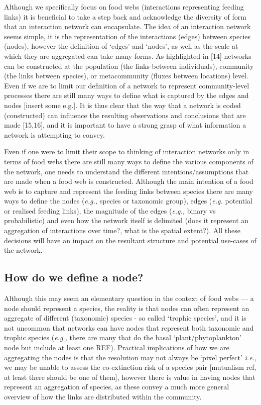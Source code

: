 \documentclass[
]{article}
\begin{document}
Although we specifically focus on food webs (interactions representing
feeding links) it is beneficial to take a step back and acknowledge the
diversity of form that an interaction network can encapsulate. The idea
of an interaction network seems simple, it is the representation of the
interactions (edges) between species (nodes), however the definition of
`edges' and `nodes', as well as the scale at which they are aggregated
can take many forms. As highlighted in {[}14{]} networks can be
constructed at the population (the links between individuals), community
(the links between species), or metacommunity (fluxes between locations)
level. Even if we are to limit our definition of a network to represent
community-level processes there are still many ways to define what is
captured by the edges and nodes {[}insert some e.g.{]}. It is thus clear
that the way that a network is coded (constructed) can influence the
resulting observations and conclusions that are made {[}15,16{]}, and it
is important to have a strong grasp of what information a network is
attempting to convey.

Even if one were to limit their scope to thinking of interaction
networks only in terms of food webs there are still many ways to define
the various components of the network, one needs to understand the
different intentions/assumptions that are made when a food web is
constructed. Although the main intention of a food web is to capture and
represent the feeding links between species there are many ways to
define the nodes (\emph{e.g.,} species or taxonomic group), edges
(\emph{e.g.} potential or realised feeding links), the magnitude of the
edges (\emph{e.g.,} binary vs probabilistic) and even how the network
itself is delimited (does it represent an aggregation of interactions
over time?, what is the spatial extent?). All these decisions will have
an impact on the resultant structure and potential use-cases of the
network.

\subsection{How do we define a node?}\label{how-do-we-define-a-node}

Although this may seem an elementary question in the context of food
webs --- a node should represent a species, the reality is that nodes
can often represent an aggregate of different (taxonomic) species - so
called `trophic species', and it is not uncommon that networks can have
nodes that represent both taxonomic and trophic species (\emph{e.g.,}
there are many that do the basal `plant/phytoplankton' node but include
at least one REF). Practical implications of how we are aggregating the
nodes is that the resolution may not always be `pixel perfect'
\emph{i.e.,} we may be unable to assess the co-extinction risk of a
species pair {[}mutualism ref, at least there should be one of them{]},
however there is value in having nodes that represent an aggregation of
species, as these convey a much more general overview of how the links
are distributed within the community.
\end{document}
